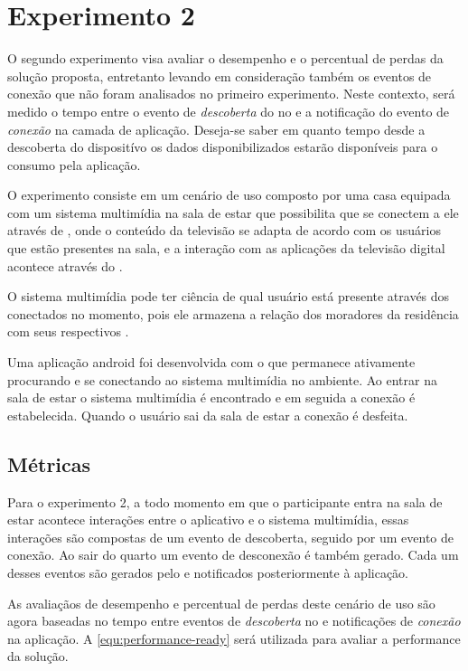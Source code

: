 \section{Experimento 2}

O segundo experimento visa avaliar o desempenho e o percentual de perdas da solução proposta, entretanto levando em consideração também os eventos de conexão que não foram analisados no primeiro experimento.
Neste contexto, será medido o tempo entre o evento de \emph{descoberta} do \smartobj no \stwopa e a notificação do evento de \emph{conexão} na camada de aplicação.
Deseja-se saber em quanto tempo desde a descoberta do dispositívo os dados disponibilizados estarão disponíveis para o consumo pela aplicação.

O experimento consiste em um cenário de uso composto por uma casa equipada com um sistema multimídia na sala de estar que possibilita que \smartphones se conectem a ele através de \bluetooth, onde o conteúdo da televisão se adapta de acordo com os usuários que estão presentes na sala, e a interação com as aplicações da televisão digital acontece através do \smartphone.

O sistema multimídia pode ter ciência de qual usuário está presente através dos \smartphones conectados no momento, pois ele armazena a relação dos moradores da residência com seus respectivos \smartphones.

Uma aplicação android foi desenvolvida com o \middleware \mhubcddl que permanece ativamente procurando e se conectando ao sistema multimídia no ambiente. Ao entrar na sala de estar o sistema multimídia é encontrado e em seguida a conexão é estabelecida. Quando o usuário sai da sala de estar a conexão é desfeita. 

\subsection{Métricas}

Para o experimento 2, a todo momento em que o participante entra na sala de estar acontece interações entre o aplicativo e o sistema multimídia, essas interações são compostas de um evento de descoberta, seguido por um evento de conexão. Ao sair do quarto um evento de desconexão é também gerado. Cada um desses eventos são gerados pelo \stwopa e notificados posteriormente à aplicação.

As avaliaçãos de desempenho e percentual de perdas deste cenário de uso são agora baseadas no tempo entre eventos de \emph{descoberta} no \stwopa e notificações de \emph{conexão} na aplicação.  
A \autoref{equ:performance-ready} será utilizada para avaliar a performance da solução.

